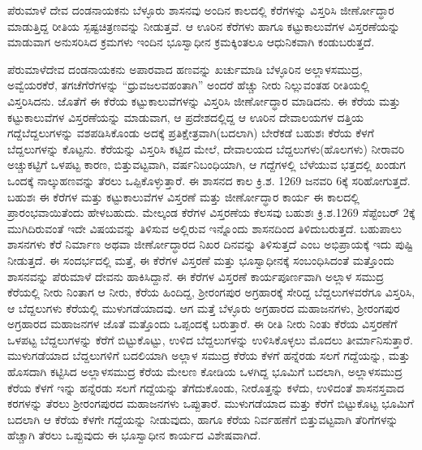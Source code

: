 ಪೆರುಮಾಳೆ ದೇವ ದಂಡನಾಯಕನು ಬೆಳ್ಳೂರು ಶಾಸನವು ಅಂದಿನ ಕಾಲದಲ್ಲಿ ಕೆರೆಗಳನ್ನು ವಿಸ್ತರಿಸಿ ಜೀರ್ಣೋದ್ಧಾರ ಮಾಡುತ್ತಿದ್ದ ರೀತಿಯ ಸ್ಪಷ್ಟಚಿತ್ರಣವನ್ನು ನೀಡುತ್ತವೆ. ಆ ಊರಿನ ಕೆರೆಗಳು ಹಾಗೂ ಕಟ್ಟುಕಾಲುವೆಗಳ ವಿಸ್ತರಣೆಯನ್ನು ಮಾಡುವಾಗ ಅನುಸರಿಸಿದ ಕ್ರಮಗಳು ಇಂದಿನ ಭೂಸ್ವಾಧೀನ ಕ್ರಮಕ್ಕಿಂತಲೂ ಆಧುನಿಕವಾಗಿ ಕಂಡುಬರುತ್ತದೆ.

ಪೆರುಮಾಳೆದೇವ ದಂಡನಾಯಕನು ಅಪಾರವಾದ ಹಣವನ್ನು ಖರ್ಚುಮಾಡಿ ಬೆಳ್ಳೂರಿನ ಅಲ್ಲಾಳಸಮುದ್ರ, ಅವ್ವೆಯರಕೆರೆ, ತಗಚೆಗೆರೆಗಳನ್ನು “ಧ್ರುವಜಲವಹಂತಾಗಿ” ಅಂದರೆ ಹೆಚ್ಚು ನೀರು ನಿಲ್ಲುವಂತಹ ರೀತಿಯಲ್ಲಿ ವಿಸ್ತರಿಸಿದನು. ಜೊತೆಗೆ ಈ ಕೆರೆಯ ಕಟ್ಟುಕಾಲುವೆಗಳನ್ನು ವಿಸ್ತರಿಸಿ ಜೀರ್ಣೋದ್ಧಾರ ಮಾಡಿದನು. ಈ ಕೆರೆಯ ಮತ್ತು ಕಟ್ಟುಕಾಲುವೆಗಳ ವಿಸ್ತರಣೆಯನ್ನು ಮಾಡುವಾಗ, ಆ ಪ್ರದೇಶದಲ್ಲಿದ್ದ ಆ ಊರಿನ ದೇವಾಲಯಗಳ ದತ್ತಿಯ ಗದ್ದೆಬೆದ್ದಲುಗಳನ್ನು ವಶಪಡಿಸಿಕೊಂಡು ಅದಕ್ಕೆ ಪ್ರತಿಕ್ಷೇತ್ರವಾಗಿ(ಬದಲಾಗಿ) ಬೇರೆಕಡೆ ಬಹುಶಃ ಕೆರೆಯ ಕೆಳಗೆ ಬೆದ್ದಲುಗಳನ್ನು ಕೊಟ್ಟನು. ಕೆರೆಯನ್ನು ವಿಸ್ತರಿಸಿ ಕಟ್ಟಿದ ಮೇಲೆ, ದೇವಾಲಯದ ಬೆದ್ದಲುಗಳು(ಹೊಲಗಳು) ನೀರಾವರಿ ಅಚ್ಚುಕಟ್ಟಿಗೆ ಒಳಪಟ್ಟ ಕಾರಣ, ಬಿತ್ತುವಟ್ಟವಾಗಿ, ವರ್ಷನಿಬಂಧಿಯಾಗಿ, ಆ ಗದ್ದೆಗಳಲ್ಲಿ ಬೆಳೆಯುವ ಭತ್ತದಲ್ಲಿ ಖಂಡುಗ ಒಂದಕ್ಕೆ ನಾಲ್ಕುಹಣವನ್ನು ತೆರಲು ಒಪ್ಪಿಕೊಳ್ಳುತ್ತಾರೆ. ಈ ಶಾಸನದ ಕಾಲ ಕ್ರಿ.ಶ. 1269 ಜನವರಿ 6ಕ್ಕೆ ಸರಿಹೋಗುತ್ತದೆ. ಬಹುಶಃ ಈ ಕೆರೆಗಳ ಮತ್ತು ಕಟ್ಟುಕಾಲುವೆಗಳ ವಿಸ್ತರಣೆ ಮತ್ತು ಜೀರ್ಣೋದ್ಧಾರ ಕಾರ್ಯ ಈ ಕಾಲದಲ್ಲಿ ಪ್ರಾರಂಭವಾಯಿತೆಂದು ಹೇಳಬಹುದು. ಮೇಲ್ಕಂಡ ಕೆರೆಗಳ ವಿಸ್ತರಣೆಯ ಕೆಲಸವು ಬಹುಶಃ ಕ್ರಿ.ಶ.1269 ಸೆಪ್ಟೆಂಬರ್​ 2ಕ್ಕೆ ಮುಗಿದಿರುವಂತೆ ಇದೇ ವಿಷಯವನ್ನು ತಿಳಿಸುವ ಅಲ್ಲಿರುವ ಇನ್ನೊಂದು ಶಾಸನದಿಂದ ತಿಳಿದುಬರುತ್ತದೆ. ಬಹುಪಾಲು ಶಾಸನಗಳು ಕೆರೆ ನಿರ್ಮಾಣ ಅಥವಾ ಜೀರ್ಣೋದ್ಧಾರದ ನಿಖರ ದಿನವನ್ನು ತಿಳಿಸುತ್ತದೆ ಎಂಬ ಅಭಿಪ್ರಾಯಕ್ಕೆ ಇದು ಪುಷ್ಟಿ ನೀಡುತ್ತದೆ. ಈ ಸಂದರ್ಭದಲ್ಲಿ ಮತ್ತೆ, ಈ ಕೆರೆಗಳ ವಿಸ್ತರಣೆ ಮತ್ತು ಭೂಸ್ವಾಧೀನಕ್ಕೆ ಸಂಬಂಧಿಸಿದಂತೆ ಮತ್ತೊಂದು ಶಾಸನವನ್ನು ಪೆರುಮಾಳೆ ದೇವನು ಹಾಕಿಸಿದ್ದಾನೆ. ಈ ಕೆರೆಗಳ ವಿಸ್ತರಣೆ ಕಾರ್ಯಪೂರ್ಣವಾಗಿ ಅಲ್ಲಾಳ ಸಮುದ್ರ ಕೆರೆಯಲ್ಲಿ ನೀರು ನಿಂತಾಗ ಆ ನೀರು, ಕೆರೆಯ ಹಿಂದಿದ್ದ, ಶ‍್ರೀರಂಗಪುರ ಅಗ್ರಹಾರಕ್ಕೆ ಸೇರಿದ್ದ ಬೆದ್ದಲುಗಳವರೆಗೂ ವಿಸ್ತರಿಸಿ, ಆ ಬೆದ್ದಲುಗಳು ಕೆರೆಯಲ್ಲಿ ಮುಳುಗಡೆಯಾದವು. ಆಗ ಮತ್ತೆ ಬೆಳ್ಳೂರು ಅಗ್ರಹಾರದ ಮಹಾಜನಗಳು, ಶ‍್ರೀರಂಗಪುರ ಅಗ್ರಹಾರದ ಮಹಾಜನಗಳ ಜೊತೆ ಮತ್ತೊಂದು ಒಪ್ಪಂದಕ್ಕೆ ಬರುತ್ತಾರೆ. ಈ ರೀತಿ ನೀರು ನಿಂತು ಕೆರೆಯ ವಿಸ್ತರಣೆಗೆ ಒಳಪಟ್ಟ ಬೆದ್ದಲುಗಳನ್ನು ಕೆರೆಗೆ ಬಿಟ್ಟುಕೊಟ್ಟು, ಉಳಿದ ಬೆದ್ದಲುಗಳನ್ನು ಉಳಿಸಿಕೊಳ್ಳಲು ಮೊದಲು ತೀರ್ಮಾನಿಸುತ್ತಾರೆ. ಮುಳುಗಡೆಯಾದ ಬೆದ್ದಲುಗಳಿಗೆ ಬದಲಿಯಾಗಿ ಅಲ್ಲಾಳ ಸಮುದ್ರ ಕೆರೆಯ ಕೆಳಗೆ ಹನ್ನೆರಡು ಸಲಗೆ ಗದ್ದೆಯನ್ನು, ಮತ್ತು ಹೊಸದಾಗಿ ಕಟ್ಟಿಸಿದ ಅಲ್ಲಾಳಸಮುದ್ರ ಕೆರೆಯ ಮೇಲಣ ಕೋಡಿಯ ಒಳಗಿದ್ದ ಭೂಮಿಗೆ ಬದಲಾಗಿ, ಅಲ್ಲಾಳಸಮುದ್ರ ಕೆರೆಯ ಕೆಳಗೆ ಇನ್ನು ಹನ್ನೆರಡು ಸಲಗೆ ಗದ್ದೆಯನ್ನು ತೆಗೆದುಕೊಂಡು, ನೀರೊತ್ತನ್ನು ಕಳೆದು, ಉಳಿದಂತೆ ಶಾಸನಸ್ತವಾದ ಕರಗಳನ್ನು ತೆರಲು ಶ‍್ರೀರಂಗಪುರದ ಮಹಾಜನಗಳು ಒಪ್ಪುತಾರೆ. ಮುಳುಗಡೆಯಾದ ಮತ್ತು ಕೆರೆಗೆ ಬಿಟ್ಟುಕೊಟ್ಟ ಭೂಮಿಗೆ ಬದಲಾಗಿ ಆ ಕೆರೆಯ ಕೆಳಗೇ ಗದ್ದೆಯನ್ನು ನೀಡುವುದು, ಹಾಗೂ ಕೆರೆಯ ನಿರ್ವಹಣೆಗೆ ಬಿತ್ತುವಟ್ಟವಾಗಿ ತೆರಿಗೆಗಳನ್ನು ಹೆಚ್ಚಾಗಿ ತೆರಲು ಒಪ್ಪುವುದು ಈ ಭೂಸ್ವಾಧೀನ ಕಾರ್ಯದ ವಿಶೇಷವಾಗಿದೆ.

